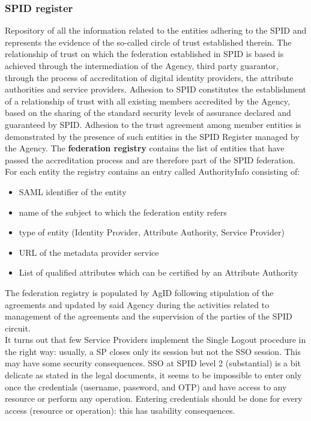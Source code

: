 \documentclass[a4paper, 10pt, titlepage]{article}
\begin{document}
\subsubsection{SPID register}
Repository of all the information related to the entities adhering to the SPID and represents the evidence of the so-called circle of trust established therein. The relationship of trust on which the federation established in SPID is based is achieved through the intermediation of the Agency, third party guarantor, through the process of accreditation of digital identity providers, the attribute authorities and service providers. Adhesion to SPID constitutes the establishment of a relationship of trust with all existing members accredited by the Agency, based on the sharing of the standard security levels of assurance declared and guaranteed by SPID. Adhesion to the trust agreement among member entities is demonstrated by the presence of such entities in the SPID Register managed by the Agency. The \textbf{federation registry} contains the list of entities that have passed the accreditation process and are therefore part of the SPID federation. For each entity the registry contains an entry called AuthorityInfo consisting of:
\begin{itemize}
\item SAML identifier of the entity
\item name of the subject to which the federation entity refers
\item type of entity (Identity Provider, Attribute Authority, Service Provider)
\item URL of the metadata provider service
\item List of qualified attributes which can be certified by an Attribute Authority
\end{itemize}
The federation registry is populated by AgID following stipulation of the agreements and updated by said Agency during the activities related to management of the agreements and the supervision of the parties of the SPID circuit. \medskip\\
It turns out that few Service Providers implement the Single Logout procedure in the right way: usually, a SP closes only its session but not the SSO session. This may have some security consequences. SSO at SPID level 2 (substantial) is a bit delicate as stated in the legal documents, it seems to be impossible to enter only once the credentials (username, password, and OTP) and have access to any resource or perform any operation. Entering credentials should be done for every access (resource or operation): this has usability consequences.
\end{document}
